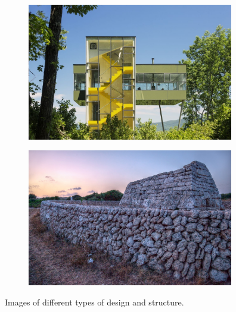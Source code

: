 \documentclass[aspectratio=169]{beamer}
\begin{document}
\begin{frame}{}

\begin{figure}[h]
\begin{columns}
    \column{\dimexpr\paperwidth-10pt} 
  \end{columns}
\begin{subfigure}{0.45\textwidth}
\includegraphics[width=0.9\linewidth, height=6cm]{fig1.jpg} 
\caption{}
\label{fig:subim3}
 
\end{subfigure}
\begin{subfigure}{0.5\textwidth}
\includegraphics[width=0.9\linewidth, height=6cm]{fig2.jpg}
\caption{}
\label{fig:subim4}
\end{subfigure}
\label{fig:image3}
Images of different types of design and structure.
\end{figure}
\end{frame}
\end{document}
